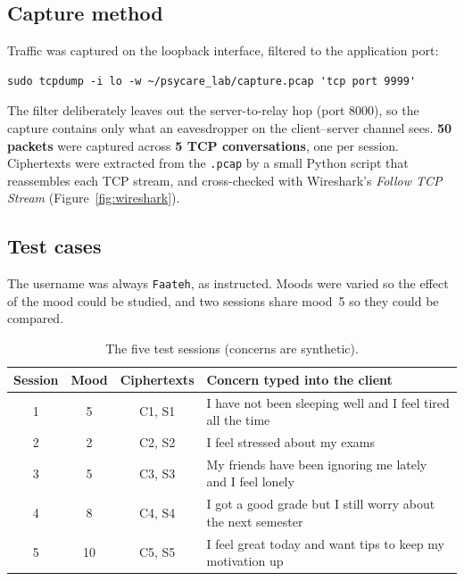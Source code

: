 \documentclass[11pt,a4paper]{article}
\DeclareRobustCommand{\_}{\textunderscore\allowbreak}  %
\newcommand{\ct}[1]{\texttt{#1}}
\begin{document}
\subsection{Capture method}
Traffic was captured on the loopback interface, filtered to the application port:
\begin{lstlisting}
sudo tcpdump -i lo -w ~/psycare_lab/capture.pcap 'tcp port 9999'
\end{lstlisting}
The filter deliberately leaves out the server-to-relay hop (port 8000), so the capture contains only what an
eavesdropper on the client--server channel sees. \textbf{50 packets} were captured across \textbf{5 TCP
conversations}, one per session. Ciphertexts were extracted from the \ct{.pcap} by
a small Python script that reassembles each TCP stream, and cross-checked with Wireshark's \emph{Follow TCP Stream}
(Figure~\ref{fig:wireshark}).

\subsection{Test cases}
The username was always \ct{Faateh}, as instructed. Moods were varied so the effect of the mood could be studied, and
two sessions share mood~5 so they could be compared.

\begin{table}[H]\centering
\caption{The five test sessions (concerns are synthetic).}
\begin{tabularx}{\textwidth}{c c c X}
\toprule
Session & Mood & Ciphertexts & Concern typed into the client \\
\midrule
1 & 5  & C1, S1 & I have not been sleeping well and I feel tired all the time \\
2 & 2  & C2, S2 & I feel stressed about my exams \\
3 & 5  & C3, S3 & My friends have been ignoring me lately and I feel lonely \\
4 & 8  & C4, S4 & I got a good grade but I still worry about the next semester \\
5 & 10 & C5, S5 & I feel great today and want tips to keep my motivation up \\
\bottomrule
\end{tabularx}
\end{table}
\end{document}
